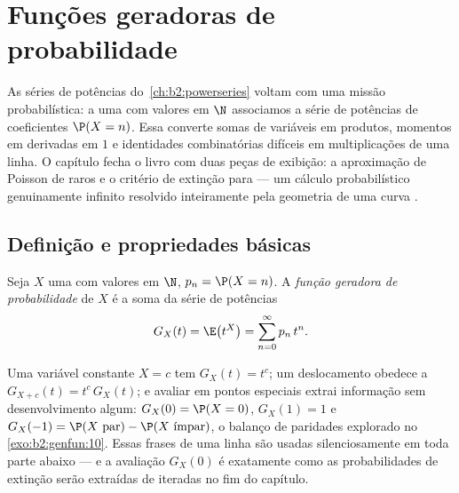 \chapter{Funções geradoras de probabilidade}\label{ch:b2:genfun}

As séries de potências do~\cref{ch:b2:powerseries} voltam com uma
missão probabilística: a uma  com valores em $\N$ associamos
a série de potências de coeficientes $\P(X = n)$. Essa
\emph{} converte somas de variáveis 
em produtos, momentos em derivadas em $1$ e identidades
combinatórias difíceis em multiplicações de uma linha. O
capítulo fecha o livro com duas peças de exibição: a aproximação
de Poisson de  raros e o critério de extinção para
 --- um cálculo probabilístico genuinamente
infinito resolvido inteiramente pela geometria de uma curva .

\section{Definição e propriedades básicas}

\begin{definition}\label{def:b2:genfun:pgf}
Seja $X$ uma  com valores em $\N$, $p_n = \P(X = n)$. A
\emph{função geradora de probabilidade} de $X$ é a soma da
série de potências
\[
G_X(t) = \E\bigl(t^X\bigr) = \sum_{n=0}^{\infty} p_n\,t^n .
\]
\end{definition}

\begin{example}\label{ex:b2:genfun:firstreflexes}
Uma variável constante $X = c$ tem $G_X(t) = t^c$; um deslocamento obedece a
$G_{X+c}(t) = t^c\,G_X(t)$; e avaliar em pontos especiais
extrai informação sem desenvolvimento algum: $G_X(0) = \P(X
= 0)$, $G_X(1) = 1$ e $G_X(-1) = \P(X\text{ par}) -
\P(X\text{ ímpar})$, o balanço de paridades explorado no
\cref{exo:b2:genfun:10}. Essas frases de uma linha são usadas silenciosamente
em toda parte abaixo --- e a avaliação $G_X(0)$ é exatamente
como as probabilidades de extinção serão extraídas de  iteradas no fim do capítulo.
\end{example}

